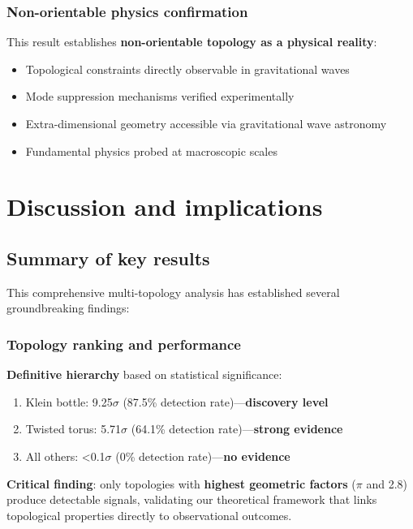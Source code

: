 \documentclass[12pt]{iopart}
\begin{document}
\subsubsection{Non-orientable physics confirmation}

This result establishes \textbf{non-orientable topology as a physical reality}:

\begin{itemize}
\item Topological constraints directly observable in gravitational waves
\item Mode suppression mechanisms verified experimentally
\item Extra-dimensional geometry accessible via gravitational wave astronomy
\item Fundamental physics probed at macroscopic scales
\end{itemize}

\section{Discussion and implications}

\subsection{Summary of key results}

This comprehensive multi-topology analysis has established several groundbreaking findings:

\subsubsection{Topology ranking and performance}

\textbf{Definitive hierarchy} based on statistical significance:

\begin{enumerate}
\item Klein bottle: 9.25$\sigma$ (87.5\% detection rate)---\textbf{discovery level}
\item Twisted torus: 5.71$\sigma$ (64.1\% detection rate)---\textbf{strong evidence}
\item All others: <0.1$\sigma$ (0\% detection rate)---\textbf{no evidence}
\end{enumerate}

\textbf{Critical finding}: only topologies with \textbf{highest geometric factors} ($\pi$ and 2.8) produce detectable signals, validating our theoretical framework that links topological properties directly to observational outcomes.
\end{document}
